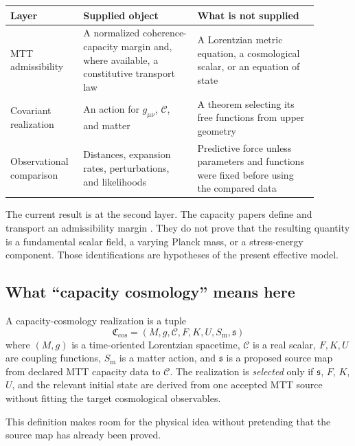 \documentclass[11pt]{article}
\newcommand{\CC}{\mathcal C}
\begin{document}
\begin{center}
\begin{tabular}{>{\raggedright\arraybackslash}p{0.19\linewidth}
                >{\raggedright\arraybackslash}p{0.34\linewidth}
                >{\raggedright\arraybackslash}p{0.36\linewidth}}
\toprule
Layer & Supplied object & What is not supplied \\
\midrule
MTT admissibility
& A normalized coherence-capacity margin and, where available, a
constitutive transport law
& A Lorentzian metric equation, a cosmological scalar, or an equation of
state \\
Covariant realization
& An action for $g_{\mu\nu}$, $\CC$, and matter
& A theorem selecting its free functions from upper geometry \\
Observational comparison
& Distances, expansion rates, perturbations, and likelihoods
& Predictive force unless parameters and functions were fixed before
using the compared data \\
\bottomrule
\end{tabular}
\end{center}

The current result is at the second layer.  The capacity papers define
and transport an admissibility margin
\cite{nero_capacity_2026,nero_capacity_dynamics_2026}.  They do not prove
that the resulting quantity is a fundamental scalar field, a varying
Planck mass, or a stress-energy component.  Those identifications are
hypotheses of the present effective model.

\subsection{What ``capacity cosmology'' means here}

\begin{definition}
A capacity-cosmology realization is a tuple
\[
 \mathfrak C_{\mathrm{cos}}
 =
 (M,g,\CC,F,K,U,S_{\mathrm m},\mathfrak s)
\]
where $(M,g)$ is a time-oriented Lorentzian spacetime, $\CC$ is a real
scalar, $F,K,U$ are coupling functions, $S_{\mathrm m}$ is a matter
action, and $\mathfrak s$ is a proposed source map from declared MTT
capacity data to $\CC$.  The realization is \emph{selected} only if
$\mathfrak s$, $F$, $K$, $U$, and the relevant initial state are derived
from one accepted MTT source without fitting the target cosmological
observables.
\end{definition}

This definition makes room for the physical idea without pretending that
the source map has already been proved.
\end{document}
